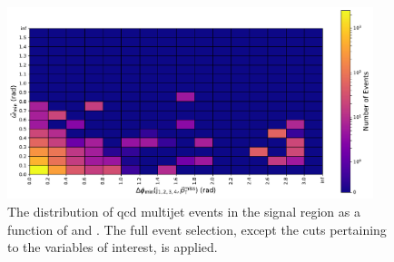 \begin{figure}[htbp]
    \centering
    \includegraphics[width=0.95\textwidth]{figures/category_optimisations/omega_vs_dphi.pdf}
    \caption[The distribution of QCD multijet events in the signal region as a function of \omegaTilde and \mindphi]{The distribution of \acrshort{qcd} multijet events in the signal region as a function of \omegaTilde and \mindphi. The full event selection, except the cuts pertaining to the variables of interest, is applied.}
    \label{fig:htoinv_omega_vs_dphi_qcd_SR}
\end{figure}

